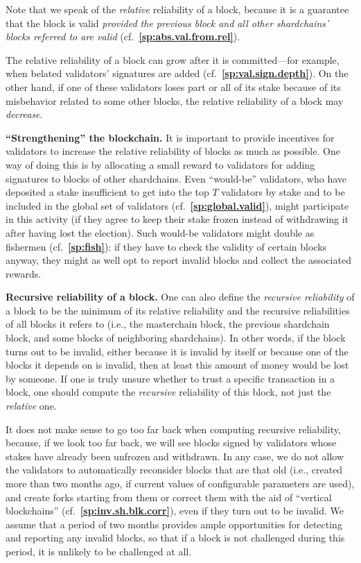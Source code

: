 \documentclass[12pt,oneside]{article}
\def\makepoint#1{\medbreak\noindent{\bf #1.\ }}
\def\nxsubpoint{\refstepcounter{subsubsection}%
  \smallbreak\makepoint{\thesubsubsection}}
\def\refpoint#1{{\rm\textbf{\ref{#1}}}}
\let\ptref=\refpoint
\def\embt(#1.){\textbf{#1.}}
\begin{document}
Note that we speak of the {\em relative\/} reliability of a block,
because it is a guarantee that the block is valid {\em provided the
  previous block and all other shardchains' blocks referred to are
  valid\/} (cf.~\ptref{sp:abs.val.from.rel}).

The relative reliability of a block can grow after it is
committed---for example, when belated validators' signatures are added
(cf.~\ptref{sp:val.sign.depth}). On the other hand, if one of these
validators loses part or all of its stake because of its misbehavior
related to some other blocks, the relative reliability of a block may
{\em decrease}.

\nxsubpoint \embt(``Strengthening'' the blockchain.)  It is important
to provide incentives for validators to increase the relative
reliability of blocks as much as possible. One way of doing this is by
allocating a small reward to validators for adding signatures to
blocks of other shardchains. Even ``would-be'' validators, who have
deposited a stake insufficient to get into the top $T$ validators by
stake and to be included in the global set of validators
(cf.~\ptref{sp:global.valid}), might participate in this activity (if
they agree to keep their stake frozen instead of withdrawing it after
having lost the election). Such would-be validators might double as
fishermen (cf.~\ptref{sp:fish}): if they have to check the validity of
certain blocks anyway, they might as well opt to report invalid blocks and collect the associated rewards.

\nxsubpoint\label{sp:rec.rel} \embt(Recursive reliability of a block.)
One can also define the {\em recursive reliability\/} of a block to be
the minimum of its relative reliability and the recursive
reliabilities of all blocks it refers to (i.e., the masterchain block,
the previous shardchain block, and some blocks of neighboring
shardchains). In other words, if the block turns out to be invalid,
either because it is invalid by itself or because one of the blocks it
depends on is invalid, then at least this amount of money would be
lost by someone. If one is truly unsure whether to trust a specific
transaction in a block, one should compute the {\em recursive\/}
reliability of this block, not just the {\em relative\/} one.

It does not make sense to go too far back when computing recursive
reliability, because, if we look too far back, we will see blocks
signed by validators whose stakes have already been unfrozen and
withdrawn. In any case, we do not allow the validators to
automatically reconsider blocks that are that old (i.e., created more
than two months ago, if current values of configurable parameters are
used), and create forks starting from them or correct them with the
aid of ``vertical blockchains'' (cf.~\ptref{sp:inv.sh.blk.corr}), even
if they turn out to be invalid. We assume that a period of two months
provides ample opportunities for detecting and reporting any invalid
blocks, so that if a block is not challenged during this period, it is
unlikely to be challenged at all.
\end{document}
